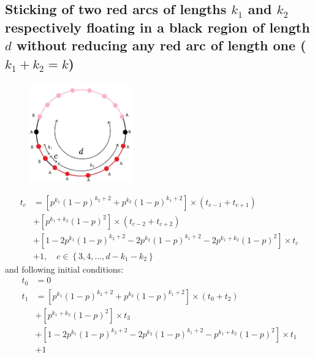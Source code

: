 \documentclass[]{book}
\theoremstyle{definition}
\begin{document}
\subsection{Sticking of two red arcs of lengths $k_1$ and $k_2$ respectively floating in a black region of length $d$ without reducing any red arc of length one ($k_1 + k_2 = k$)}
\begin{figure}[H]
    \centering\includegraphics[width=0.4\textwidth]{figures/arcs sticking.jpg}
    \caption{}
\end{figure}

\begin{equation}
\begin{split}
    t_c &= \left[p^{k_1}\left( 1-p \right)^{k_2+2} + p^{k_2}\left( 1-p \right)^{k_1+2} \right] \times \left( t_{c-1} + t_{c+1} \right) \\
    &+ \left[ p^{k_1+k_2}\left( 1-p \right)^2 \right] \times \left( t_{c-2}+t_{c+2} \right) \\
    &+ \left[ 1 - 2p^{k_1}\left( 1-p \right)^{k_2+2} - 2p^{k_2}\left( 1-p \right)^{k_1+2} - 2p^{k_1+k_2}\left( 1-p \right)^2 \right] \times t_c \\
    &+ 1, \quad c \in \left\{ 3, 4, \hdots, d - k_1 - k_2 \right\}
\end{split}
\end{equation}
and following initial conditions:
\begin{equation}
\begin{split}
    t_0 &= 0 \\
    t_1 &= \left[p^{k_1}\left( 1-p \right)^{k_2+2} + p^{k_2}\left( 1-p \right)^{k_1+2} \right] \times \left( t_0 + t_2 \right) \\
    &+ \left[ p^{k_1+k_2}\left( 1-p \right)^2 \right] \times t_3 \\
    &+ \left[ 1 - 2p^{k_1}\left( 1-p \right)^{k_2+2} - 2p^{k_2}\left( 1-p \right)^{k_1+2} - p^{k_1+k_2}\left( 1-p \right)^2 \right] \times t_1 \\
    &+ 1
\end{split}
\end{equation}
\end{document}
